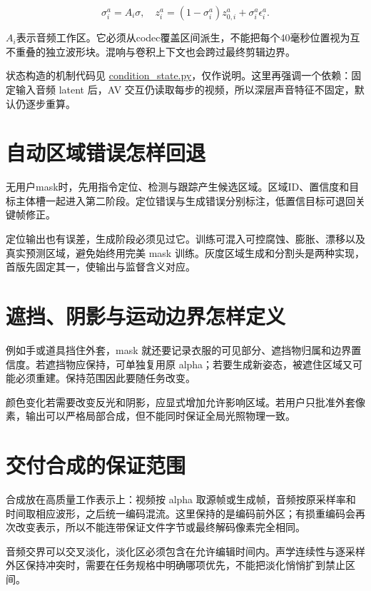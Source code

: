 \[
\sigma_i^a=A_i\sigma,\quad
z_i^a=(1-\sigma_i^a)z_{0,i}^a+\sigma_i^a\epsilon_i^a.
\]

\(A_i\)表示音频工作区。它必须从codec覆盖区间派生，不能把每个40毫秒位置视为互不重叠的独立波形块。混响与卷积上下文也会跨过最终剪辑边界。

状态构造的机制代码见 \hyperref[code-condition-state]{condition\_state.py}，仅作说明。这里再强调一个依赖：固定输入音频 latent 后，AV 交互仍读取每步的视频，所以深层声音特征不固定，默认仍逐步重算。

\section{自动区域错误怎样回退}\label{seedance-m23-ux81eaux52a8ux533aux57dfux9519ux8befux600eux6837ux56deux9000}

无用户mask时，先用指令定位、检测与跟踪产生候选区域。区域ID、置信度和目标主体槽一起进入第二阶段。定位错误与生成错误分别标注，低置信目标可退回关键帧修正。

定位输出也有误差，生成阶段必须见过它。训练可混入可控腐蚀、膨胀、漂移以及真实预测区域，避免始终用完美 mask 训练。灰度区域生成和分割头是两种实现，首版先固定其一，使输出与监督含义对应。

\section{遮挡、阴影与运动边界怎样定义}\label{seedance-m23-ux906eux6321ux9634ux5f71ux4e0eux8fd0ux52a8ux8fb9ux754cux600eux6837ux5b9aux4e49}

例如手或道具挡住外套，mask 就还要记录衣服的可见部分、遮挡物归属和边界置信度。若遮挡物应保持，可单独复用原 alpha；若要生成新姿态，被遮住区域又可能必须重建。保持范围因此要随任务改变。

颜色变化若需要改变反光和阴影，应显式增加允许影响区域。若用户只批准外套像素，输出可以严格局部合成，但不能同时保证全局光照物理一致。

\section{交付合成的保证范围}\label{seedance-m23-ux4ea4ux4ed8ux5408ux6210ux7684ux4fddux8bc1ux8303ux56f4}

合成放在高质量工作表示上：视频按 alpha 取源帧或生成帧，音频按原采样率和时间取相应波形，之后统一编码混流。这里保持的是编码前外区；有损重编码会再次改变表示，所以不能连带保证文件字节或最终解码像素完全相同。

音频交界可以交叉淡化，淡化区必须包含在允许编辑时间内。声学连续性与逐采样外区保持冲突时，需要在任务规格中明确哪项优先，不能把淡化悄悄扩到禁止区间。

